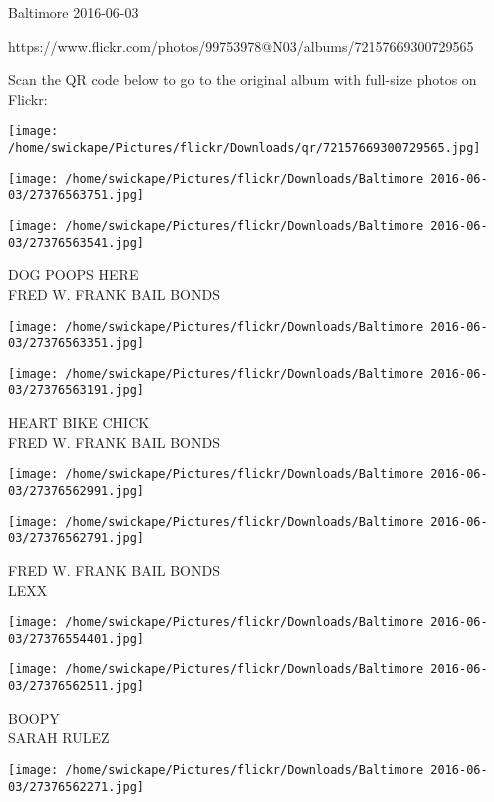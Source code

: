 \documentclass[10pt,letterpaper]{article}
\begin{document}
Baltimore 2016-06-03

https://www.flickr.com/photos/99753978@N03/albums/72157669300729565

Scan the QR code below to go to the original album with full-size photos on Flickr:

\texttt{[image: /home/swickape/Pictures/flickr/Downloads/qr/72157669300729565.jpg]}
\pagebreak

\texttt{[image: /home/swickape/Pictures/flickr/Downloads/Baltimore 2016-06-03/27376563751.jpg]}

\vspace{0.25in}
\texttt{[image: /home/swickape/Pictures/flickr/Downloads/Baltimore 2016-06-03/27376563541.jpg]}

DOG POOPS HERE\\
FRED W. FRANK BAIL BONDS\\
\pagebreak

\texttt{[image: /home/swickape/Pictures/flickr/Downloads/Baltimore 2016-06-03/27376563351.jpg]}

\vspace{0.25in}
\texttt{[image: /home/swickape/Pictures/flickr/Downloads/Baltimore 2016-06-03/27376563191.jpg]}

HEART BIKE CHICK\\
FRED W. FRANK BAIL BONDS\\
\pagebreak

\texttt{[image: /home/swickape/Pictures/flickr/Downloads/Baltimore 2016-06-03/27376562991.jpg]}

\vspace{0.25in}
\texttt{[image: /home/swickape/Pictures/flickr/Downloads/Baltimore 2016-06-03/27376562791.jpg]}

FRED W. FRANK BAIL BONDS\\
LEXX\\
\pagebreak

\texttt{[image: /home/swickape/Pictures/flickr/Downloads/Baltimore 2016-06-03/27376554401.jpg]}

\vspace{0.25in}
\texttt{[image: /home/swickape/Pictures/flickr/Downloads/Baltimore 2016-06-03/27376562511.jpg]}

BOOPY\\
SARAH RULEZ\\
\pagebreak

\texttt{[image: /home/swickape/Pictures/flickr/Downloads/Baltimore 2016-06-03/27376562271.jpg]}
\end{document}
